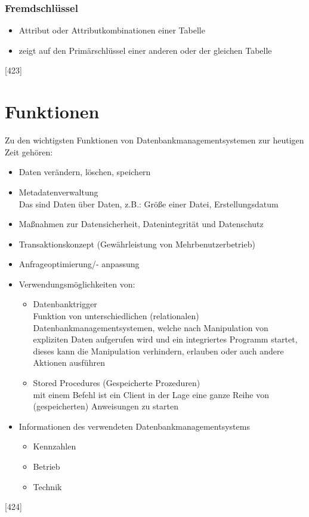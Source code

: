 \documentclass[12pt,a4paper]{report}
\begin{document}
\begin{onehalfspace}
\subsubsection{Fremdschlüssel}
\begin{itemize}
\item Attribut oder Attributkombinationen einer Tabelle
\item zeigt auf den Primärschlüssel einer anderen oder der gleichen Tabelle
\end{itemize}
[423]
\section{Funktionen}
Zu den wichtigsten Funktionen von Datenbankmanagementsystemen zur heutigen Zeit gehören:
\begin{itemize}
\item Daten verändern, löschen, speichern
\item Metadatenverwaltung\\
Das sind Daten über Daten, z.B.: Größe einer Datei, Erstellungsdatum
\item Maßnahmen zur Datensicherheit, Datenintegrität und Datenschutz
\item Transaktionskonzept (Gewährleistung von Mehrbenutzerbetrieb)
\item Anfrageoptimierung/- anpassung
\item Verwendungsmöglichkeiten von: 
\begin{itemize}
\item Datenbanktrigger\\
Funktion von unterschiedlichen (relationalen) Datenbankmanagementsystemen, welche nach Manipulation von expliziten Daten aufgerufen wird und ein integriertes Programm startet, dieses kann die Manipulation verhindern, erlauben oder auch andere Aktionen ausführen
\item Stored Procedures (Gespeicherte Prozeduren)\\
mit einem Befehl ist ein Client in der Lage eine ganze Reihe von (gespeicherten) Anweisungen zu starten
\end{itemize}
\item Informationen des verwendeten Datenbankmanagementsystems
\begin{itemize}
\item Kennzahlen
\item Betrieb
\item Technik
\end{itemize}
\end{itemize}
[424]

\end{onehalfspace}
\end{document}

